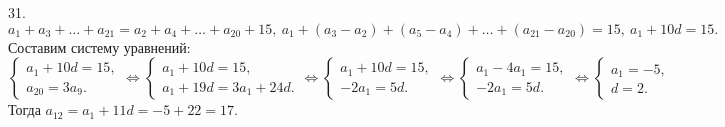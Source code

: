 31. $a_1+a_3+\ldots+a_{21}=a_2+a_4+\ldots+ a_{20}+15,\ a_1+(a_3-a_2)+(a_5-a_4)+\ldots+(a_{21}-a_{20})=15,\ a_1+10d=15.$ Составим систему уравнений:
$\begin{cases} a_1+10d=15,\\ a_{20}=3a_9.\end{cases}\Leftrightarrow
\begin{cases} a_1+10d=15,\\ a_1+19d=3a_1+24d.\end{cases}\Leftrightarrow
\begin{cases} a_1+10d=15,\\ -2a_1=5d.\end{cases}\Leftrightarrow
\begin{cases} a_1-4a_1=15,\\ -2a_1=5d.\end{cases}\Leftrightarrow
\begin{cases} a_1=-5,\\ d=2.\end{cases}$
Тогда $a_{12}=a_1+11d=-5+22=17.$\\
